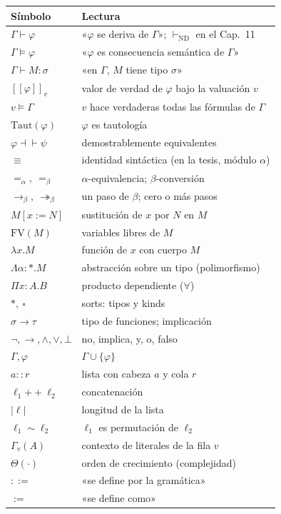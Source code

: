 \documentclass[11pt,a4paper]{article}
\newcommand{\Provnd}{\vdash_{\mathrm{ND}}}
\newcommand{\sem}[1]{[\![#1]\!]}
\newcommand{\bred}{\rightarrow_\beta}
\newcommand{\bmred}{\twoheadrightarrow_\beta}
\newcommand{\concat}{\mathbin{+\!\!+}}
\begin{document}
{\small
\begin{longtable}{@{}p{}p{}@{}}
\toprule
\textbf{Símbolo} & \textbf{Lectura}\\
\midrule
\endhead
\(\Gamma\vdash\varphi\) & «\(\varphi\) se deriva de \(\Gamma\)»; \(\Provnd\) en el Cap.\ 11\\
\(\Gamma\models\varphi\) & «\(\varphi\) es consecuencia semántica de \(\Gamma\)»\\
\(\Gamma\vdash M:\sigma\) & «en \(\Gamma\), \(M\) tiene tipo \(\sigma\)»\\
\(\sem{\varphi}_v\) & valor de verdad de \(\varphi\) bajo la valuación \(v\)\\
\(v\models\Gamma\) & \(v\) hace verdaderas todas las fórmulas de \(\Gamma\)\\
\(\mathrm{Taut}(\varphi)\) & \(\varphi\) es tautología\\
\(\varphi\dashv\vdash\psi\) & demostrablemente equivalentes\\
\(\equiv\) & identidad sintáctica (en la tesis, módulo \(\alpha\))\\
\(=_\alpha,\ =_\beta\) & \(\alpha\)-equivalencia; \(\beta\)-conversión\\
\(\bred,\ \bmred\) & un paso de \(\beta\); cero o más pasos\\
\(M[x:=N]\) & sustitución de \(x\) por \(N\) en \(M\)\\
\(\mathrm{FV}(M)\) & variables libres de \(M\)\\
\(\lambda x.M\) & función de \(x\) con cuerpo \(M\)\\
\(\Lambda\alpha{:}*.M\) & abstracción sobre un tipo (polimorfismo)\\
\(\Pi x{:}A.B\) & producto dependiente (\(\forall\))\\
\(*,\ \square\) & sorts: tipos y kinds\\
\(\sigma\to\tau\) & tipo de funciones; implicación\\
\(\neg,\to,\wedge,\vee,\bot\) & no, implica, y, o, falso\\
\(\Gamma,\varphi\) & \(\Gamma\cup\{\varphi\}\)\\
\(a::r\) & lista con cabeza \(a\) y cola \(r\)\\
\(\ell_1\concat\ell_2\) & concatenación\\
\(|\ell|\) & longitud de la lista\\
\(\ell_1\sim\ell_2\) & \(\ell_1\) es permutación de \(\ell_2\)\\
\(\Gamma_v(A)\) & contexto de literales de la fila \(v\)\\
\(\Theta(\cdot)\) & orden de crecimiento (complejidad)\\
\(::=\) & «se define por la gramática»\\
\(:=\) & «se define como»\\
\bottomrule
\end{longtable}
}
\end{document}
